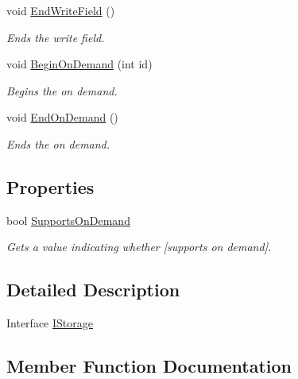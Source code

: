 \begin{DoxyCompactItemize}
void \hyperlink{interface_serialization_1_1_i_storage_a0e0c8f96ea2316bc9efc73cd27176897}{End\+Write\+Field} ()
\begin{DoxyCompactList}\small\item\em Ends the write field. \end{DoxyCompactList}\item 
void \hyperlink{interface_serialization_1_1_i_storage_aa32f1588f15cdce160d47b06b1c8ec15}{Begin\+On\+Demand} (int id)
\begin{DoxyCompactList}\small\item\em Begins the on demand. \end{DoxyCompactList}\item 
void \hyperlink{interface_serialization_1_1_i_storage_a40adb4b1e7b959e0b3baa509d3ce16f7}{End\+On\+Demand} ()
\begin{DoxyCompactList}\small\item\em Ends the on demand. \end{DoxyCompactList}\end{DoxyCompactItemize}
\subsection*{Properties}
\begin{DoxyCompactItemize}
\item 
bool \hyperlink{interface_serialization_1_1_i_storage_a6096e94c37b632da7f415a4697f80f32}{Supports\+On\+Demand}
\begin{DoxyCompactList}\small\item\em Gets a value indicating whether \mbox{[}supports on demand\mbox{]}. \end{DoxyCompactList}\end{DoxyCompactItemize}


\subsection{Detailed Description}
Interface \hyperlink{interface_serialization_1_1_i_storage}{I\+Storage} 



\subsection{Member Function Documentation}
\mbox{\label{interface_serialization_1_1_i_storage_a72684673376a726a241741854652b3ba}} 
